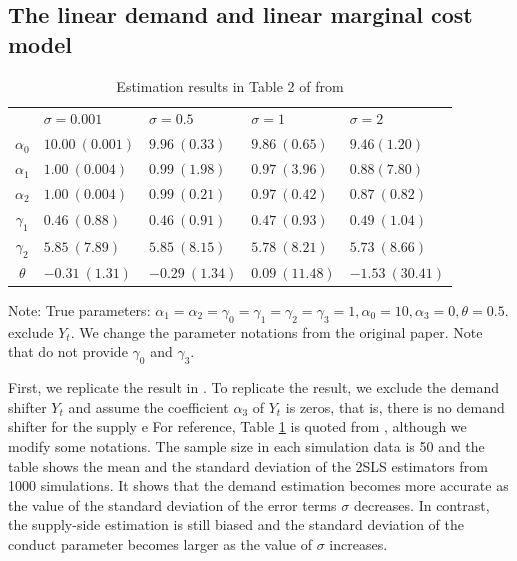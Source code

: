 \documentclass[11pt, a4paper]{article}
\begin{document}
\subsection{The linear demand and linear marginal cost model}

\begin{table}[!htbp]
    \caption{Estimation results in Table 2 of from \cite{perloff2012collinearity}}
    \label{tb:linear_linear_sigma_Perloff_Shen}
    \begin{center}
        \begin{tabular}{cllll}
            \hline
            & $\sigma=0.001$ & $\sigma=0.5$ & $\sigma=1$ & $\sigma=2$ \\
            $\alpha_0$ & $10.00\ (0.001)$ & $9.96\ (0.33)$ & $9.86\ (0.65)$ & $9.46 (1.20)$ \\
            $\alpha_1$ & $1.00\ (0.004)$ & $0.99\ (1.98)$ & $0.97\ (3.96)$ & $0.88 (7.80)$ \\
            $\alpha_2$ & $1.00\ (0.004)$ & $0.99\ (0.21)$ & $0.97\ (0.42)$ & $0.87\ (0.82)$ \\
            $\gamma_1$ & $0.46\ (0.88)$ & $0.46\ (0.91)$ & $0.47\ (0.93)$ & $0.49\ (1.04)$ \\
            $\gamma_2$ & $5.85\ (7.89)$ & $5.85\ (8.15)$ & $5.78\ (8.21)$ & $5.73\ (8.66)$ \\
            $\theta$ & $-0.31\ (1.31)$ & $-0.29\ (1.34)$ & $0.09\ (11.48)$ & $-1.53\ (30.41)$ \\
            \hline
        \end{tabular}
    \end{center}\footnotesize
    Note: True parameters: $\alpha_1 = \alpha_2 = \gamma_0 = \gamma_1 = \gamma_2  = \gamma_3 = 1, \alpha_0 = 10, \alpha_3 = 0,  \theta = 0.5$. \citet{perloff2012collinearity} exclude $Y_t$. We change the parameter notations from the original paper. Note that \cite{perloff2012collinearity} do not provide $\gamma_0$ and $\gamma_3$.
\end{table}

First, we replicate the result in \citet{perloff2012collinearity}.
To replicate the result, we exclude the demand shifter $Y_t$ and assume the coefficient $\alpha_3$ of $Y_t$ is zeros, that is, there is no demand shifter for the supply e
For reference, Table \ref{tb:linear_linear_sigma_Perloff_Shen} is quoted from \cite{perloff2012collinearity}, although we modify some notations.
The sample size in each simulation data is 50 and the table shows the mean and the standard deviation of the 2SLS estimators from 1000 simulations.
It shows that the demand estimation becomes more accurate as the value of the standard deviation of the error terms $\sigma$ decreases.
In contrast, the supply-side estimation is still biased and the standard deviation of the conduct parameter becomes larger as the value of $\sigma$ increases.
\end{document}
